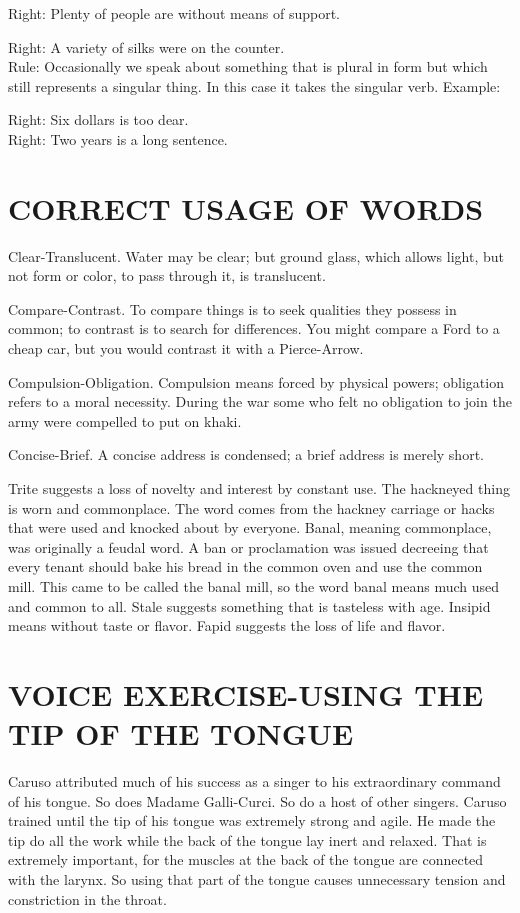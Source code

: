 \documentclass[10pt]{article}
\begin{document}
Right: Plenty of people are without means of support.

Right: A variety of silks were on the counter.\\
Rule: Occasionally we speak about something that is plural in form but which still represents a singular thing. In this case it takes the singular verb. Example:

Right: Six dollars is too dear.\\
Right: Two years is a long sentence.

\section*{CORRECT USAGE OF WORDS}
Clear-Translucent. Water may be clear; but ground glass, which allows light, but not form or color, to pass through it, is translucent.

Compare-Contrast. To compare things is to seek qualities they possess in common; to contrast is to search for differences. You might compare a Ford to a cheap car, but you would contrast it with a Pierce-Arrow.

Compulsion-Obligation. Compulsion means forced by physical powers; obligation refers to a moral necessity. During the war some who felt no obligation to join the army were compelled to put on khaki.

Concise-Brief. A concise address is condensed; a brief address is merely short.

Trite suggests a loss of novelty and interest by constant use. The hackneyed thing is worn and commonplace. The word comes from the hackney carriage or hacks that were used and knocked about by everyone. Banal, meaning commonplace, was originally a feudal word. A ban or proclamation was issued decreeing that every tenant should bake his bread in the common oven and use the common mill. This came to be called the banal mill, so the word banal means much used and common to all. Stale suggests something that is tasteless with age. Insipid means without taste or flavor. Fapid suggests the loss of life and flavor.

\section*{VOICE EXERCISE-USING THE TIP OF THE TONGUE}
Caruso attributed much of his success as a singer to his extraordinary command of his tongue. So does Madame Galli-Curci. So do a host of other singers. Caruso trained until the tip of his tongue was extremely strong and agile. He made the tip do all the work while the back of the tongue lay inert and relaxed. That is extremely important, for the muscles at the back of the tongue are connected with the larynx. So using that part of the tongue causes unnecessary tension and constriction in the throat.
\end{document}
